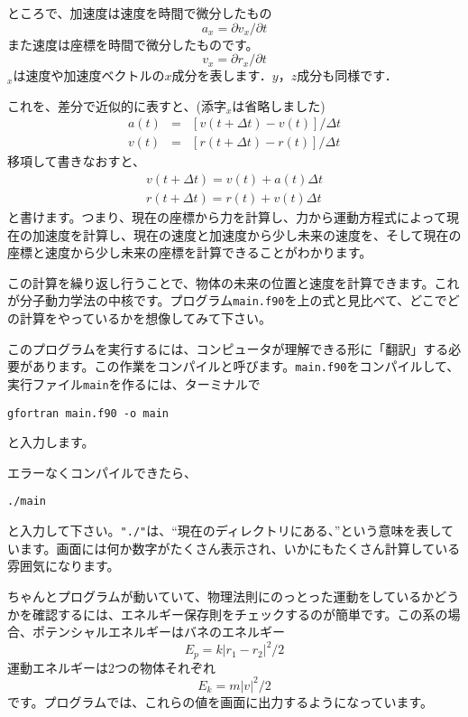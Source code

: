 \documentclass[a4,10pt]{article}
\begin{document}
ところで、加速度は速度を時間で微分したもの
\begin{equation}
a_x = \partial v_x / \partial t
\end{equation}
また速度は座標を時間で微分したものです。
\begin{equation}
v_x = \partial r_x / \partial t
\end{equation}
$_x$は速度や加速度ベクトルの$x$成分を表します．$y$，$z$成分も同様です．

これを、差分で近似的に表すと、(添字$_x$は省略しました)
\begin{eqnarray}
a(t)&=&[ v(t+\Delta t) - v(t) ] / \Delta t\\
v(t)&=&[ r(t+\Delta t) - r(t) ] / \Delta t
\end{eqnarray}
移項して書きなおすと、
\begin{eqnarray}
v(t+\Delta t) = v(t) + a(t) \Delta t\\
r(t+\Delta t) = r(t) + v(t) \Delta t
\end{eqnarray}
と書けます。つまり、現在の座標から力を計算し、力から運動方程式によって現在の加速度を計算し、現在の速度と加速度から少し未来の速度を、そして現在の座標と速度から少し未来の座標を計算できることがわかります。

この計算を繰り返し行うことで、物体の未来の位置と速度を計算できます。これが分子動力学法の中核です。プログラム{\tt main.f90}を上の式と見比べて、どこでどの計算をやっているかを想像してみて下さい。

このプログラムを実行するには、コンピュータが理解できる形に「翻訳」する必要があります。この作業をコンパイルと呼びます。{\tt main.f90}をコンパイルして、実行ファイル{\tt main}を作るには、ターミナルで
\begin{screen}\begin{verbatim}
gfortran main.f90 -o main
\end{verbatim}\end{screen}
と入力します。

エラーなくコンパイルできたら、
\begin{screen}\begin{verbatim}
./main
\end{verbatim}\end{screen}
と入力して下さい。{\tt "./"}は、``現在のディレクトリにある、''という意味を表しています。画面には何か数字がたくさん表示され、いかにもたくさん計算している雰囲気になります。

ちゃんとプログラムが動いていて、物理法則にのっとった運動をしているかどうかを確認するには、エネルギー保存則をチェックするのが簡単です。この系の場合、ポテンシャルエネルギーはバネのエネルギー
\begin{equation}\label{eq:e_sp}
E_p = k \left| r_1 - r_2 \right|^2 / 2
\end{equation}
運動エネルギーは2つの物体それぞれ
\begin{equation}
E_k = m \left| v \right|^2 / 2
\end{equation}
です。プログラムでは、これらの値を画面に出力するようになっています。
\end{document}
